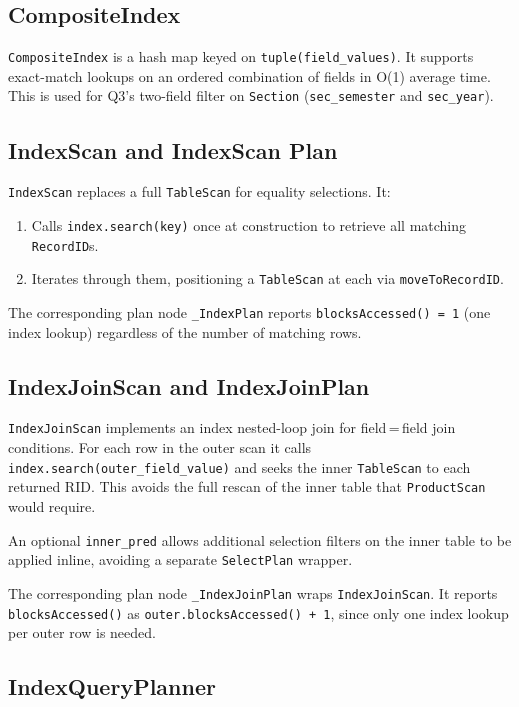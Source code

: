 \documentclass[12pt,a4paper]{article}
\begin{document}
\subsection{CompositeIndex}

\texttt{CompositeIndex} is a hash map keyed on \texttt{tuple(field\_values)}. It supports exact-match lookups on an ordered combination of fields in O(1) average time. This is used for Q3's two-field filter on \texttt{Section} (\texttt{sec\_semester} and \texttt{sec\_year}).

\subsection{IndexScan and IndexScan Plan}

\texttt{IndexScan} replaces a full \texttt{TableScan} for equality selections. It:
\begin{enumerate}[nosep]
  \item Calls \texttt{index.search(key)} once at construction to retrieve all matching \texttt{RecordID}s.
  \item Iterates through them, positioning a \texttt{TableScan} at each via \texttt{moveToRecordID}.
\end{enumerate}

The corresponding plan node \texttt{\_IndexPlan} reports \texttt{blocksAccessed() = 1} (one index lookup) regardless of the number of matching rows.

\subsection{IndexJoinScan and IndexJoinPlan}

\texttt{IndexJoinScan} implements an index nested-loop join for field\,=\,field join conditions. For each row in the outer scan it calls \texttt{index.search(outer\_field\_value)} and seeks the inner \texttt{TableScan} to each returned RID. This avoids the full rescan of the inner table that \texttt{ProductScan} would require.

An optional \texttt{inner\_pred} allows additional selection filters on the inner table
to be applied inline, avoiding a separate \texttt{SelectPlan} wrapper.

The corresponding plan node \texttt{\_IndexJoinPlan} wraps \texttt{IndexJoinScan}. It reports
\texttt{blocksAccessed()} as \texttt{outer.blocksAccessed() + 1}, since only one index
lookup per outer row is needed.

\subsection{IndexQueryPlanner}
\end{document}
